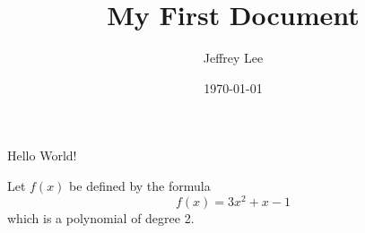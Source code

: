 \documentclass{article} %
\title{My First Document}
\author{Jeffrey Lee}
\date{\today}
\begin{document}
	\maketitle
	
	Hello World!
	
	Let $f(x)$ be defined by the formula $$f(x)=3x^2+x-1$$ which is a polynomial of degree 2.
\end{document}
